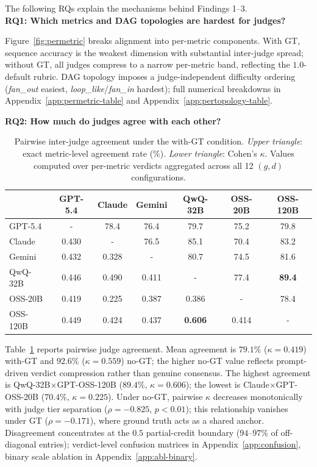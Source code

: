 The following RQs explain the mechanisms behind Findings 1--3.
\\
\textbf{RQ1: Which metrics and DAG topologies are hardest for judges?}
\label{sec:exp:disaggregation}

Figure~\ref{fig:permetric} breaks alignment into per-metric components. With GT, sequence accuracy is the weakest dimension with substantial inter-judge spread; without GT, all judges compress to a narrow per-metric band, reflecting the $1.0$-default rubric. DAG topology imposes a judge-independent difficulty ordering (\emph{fan\_out} easiest, \emph{loop\_like}/\emph{fan\_in} hardest); full numerical breakdowns in Appendix~\ref{app:permetric-table} and Appendix~\ref{app:pertopology-table}.

\textbf{RQ2: How much do judges agree with each other?}
\label{sec:exp:interjudge}

\begin{table}
\centering
\small
\vspace{-12pt}
\setlength{\tabcolsep}{4.5pt}
\renewcommand{\arraystretch}{1.05}
\caption{Pairwise inter-judge agreement under the with-GT condition.
\emph{Upper triangle}: exact metric-level agreement rate (\%).
\emph{Lower triangle}: Cohen's $\kappa$. Values computed over per-metric
verdicts aggregated across all 12 $(g, d)$ configurations.}
\label{tab:interjudge}
\begin{tabular}{@{}lcccccc@{}}
\toprule
 & \textbf{GPT-5.4} & \textbf{Claude} & \textbf{Gemini} & \textbf{QwQ-32B} & \textbf{OSS-20B} & \textbf{OSS-120B} \\
\midrule
GPT-5.4      & -   & 78.4  & 76.4  & 79.7  & 75.2  & 79.8  \\
Claude       & 0.430 & -   & 76.5  & 85.1  & 70.4  & 83.2  \\
Gemini       & 0.432 & 0.328 & -   & 80.7  & 74.5  & 81.6  \\
QwQ-32B      & 0.446 & 0.490 & 0.411 & -   & 77.4  & \textbf{89.4} \\
OSS-20B      & 0.419 & 0.225 & 0.387 & 0.386 & -   & 78.4  \\
OSS-120B     & 0.449 & 0.424 & 0.437 & \textbf{0.606} & 0.414 & -   \\
\bottomrule
\end{tabular}
\vspace{-12pt}
\end{table}

Table~\ref{tab:interjudge} reports pairwise judge agreement. Mean agreement is $79.1\%$ ($\kappa=0.419$) with-GT and $92.6\%$ ($\kappa=0.559$) no-GT; the higher no-GT value reflects prompt-driven verdict compression rather than genuine consensus. The highest agreement is QwQ-32B$\times$GPT-OSS-120B ($89.4\%$, $\kappa=0.606$); the lowest is Claude$\times$GPT-OSS-20B ($70.4\%$, $\kappa=0.225$). Under no-GT, pairwise $\kappa$ decreases monotonically with judge tier separation ($\rho=-0.825$, $p<0.01$); this relationship vanishes under GT ($\rho=-0.171$), where ground truth acts as a shared anchor. Disagreement concentrates at the $0.5$ partial-credit boundary ($94$--$97\%$ of off-diagonal entries); verdict-level confusion matrices in Appendix~\ref{app:confusion}, binary scale ablation in Appendix~\ref{app:abl-binary}.

